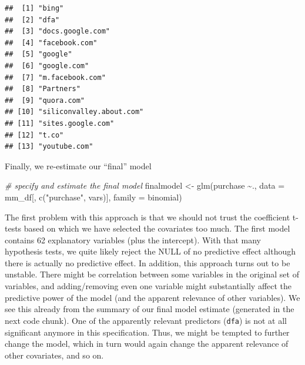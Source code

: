 \documentclass[
  12pt,
]{style/krantz}
\newenvironment{Shaded}{\begin{snugshade}}{\end{snugshade}}
\newcommand{\AttributeTok}[1]{\textcolor[rgb]{0.77,0.63,0.00}{#1}}
\newcommand{\CommentTok}[1]{\textcolor[rgb]{0.56,0.35,0.01}{\textit{#1}}}
\newcommand{\DecValTok}[1]{\textcolor[rgb]{0.00,0.00,0.81}{#1}}
\newcommand{\FloatTok}[1]{\textcolor[rgb]{0.00,0.00,0.81}{#1}}
\newcommand{\FunctionTok}[1]{\textcolor[rgb]{0.00,0.00,0.00}{#1}}
\newcommand{\NormalTok}[1]{#1}
\newcommand{\OtherTok}[1]{\textcolor[rgb]{0.56,0.35,0.01}{#1}}
\newcommand{\SpecialCharTok}[1]{\textcolor[rgb]{0.00,0.00,0.00}{#1}}
\newcommand{\StringTok}[1]{\textcolor[rgb]{0.31,0.60,0.02}{#1}}
\begin{document}
\begin{Shaded}
\end{Shaded}

\begin{verbatim}
##  [1] "bing"                   
##  [2] "dfa"                    
##  [3] "docs.google.com"        
##  [4] "facebook.com"           
##  [5] "google"                 
##  [6] "google.com"             
##  [7] "m.facebook.com"         
##  [8] "Partners"               
##  [9] "quora.com"              
## [10] "siliconvalley.about.com"
## [11] "sites.google.com"       
## [12] "t.co"                   
## [13] "youtube.com"
\end{verbatim}

Finally, we re-estimate our ``final'' model

\begin{Shaded}
\begin{Highlighting}[]
\CommentTok{\# specify and estimate the final model}
\NormalTok{finalmodel }\OtherTok{\textless{}{-}} \FunctionTok{glm}\NormalTok{(purchase }\SpecialCharTok{\textasciitilde{}}\NormalTok{.,}
                  \AttributeTok{data =}\NormalTok{ mm\_df[, }\FunctionTok{c}\NormalTok{(}\StringTok{"purchase"}\NormalTok{, vars)], }
                  \AttributeTok{family =}\NormalTok{ binomial)}
\end{Highlighting}
\end{Shaded}

The first problem with this approach is that we should not trust the coefficient t-tests based on which we have selected the covariates too much. The first model contains 62 explanatory variables (plus the intercept). With that many hypothesis tests, we quite likely reject the NULL of no predictive effect although there is actually no predictive effect. In addition, this approach turns out to be unstable. There might be correlation between some variables in the original set of variables, and adding/removing even one variable might substantially affect the predictive power of the model (and the apparent relevance of other variables). We see this already from the summary of our final model estimate (generated in the next code chunk). One of the apparently relevant predictors (\texttt{dfa}) is not at all significant anymore in this specification. Thus, we might be tempted to further change the model, which in turn would again change the apparent relevance of other covariates, and so on.
\end{document}
